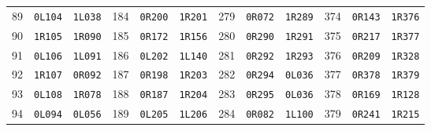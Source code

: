 \documentclass[11pt,letterpaper]{article}
\begin{document}
\begin{longtable}{@{}rll@{\qquad}rll@{\qquad}rll@{\qquad}rll@{}}
89 & \texttt{0L104} & \texttt{1L038} & 184 & \texttt{0R200} & \texttt{1R201} & 279 & \texttt{0R072} & \texttt{1R289} & 374 & \texttt{0R143} & \texttt{1R376} \\
90 & \texttt{1R105} & \texttt{1R090} & 185 & \texttt{0R172} & \texttt{1R156} & 280 & \texttt{0R290} & \texttt{1R291} & 375 & \texttt{0R217} & \texttt{1R377} \\
91 & \texttt{0L106} & \texttt{1L091} & 186 & \texttt{0L202} & \texttt{1L140} & 281 & \texttt{0R292} & \texttt{1R293} & 376 & \texttt{0R209} & \texttt{1R328} \\
92 & \texttt{1R107} & \texttt{0R092} & 187 & \texttt{0R198} & \texttt{1R203} & 282 & \texttt{0R294} & \texttt{0L036} & 377 & \texttt{0R378} & \texttt{1R379} \\
93 & \texttt{0L108} & \texttt{1R078} & 188 & \texttt{0R187} & \texttt{1R204} & 283 & \texttt{0R295} & \texttt{0L036} & 378 & \texttt{0R169} & \texttt{1R128} \\
94 & \texttt{0L094} & \texttt{0L056} & 189 & \texttt{0L205} & \texttt{1L206} & 284 & \texttt{0R082} & \texttt{1L100} & 379 & \texttt{0R241} & \texttt{1R215} \\
\end{longtable}
\endgroup
\end{document}
